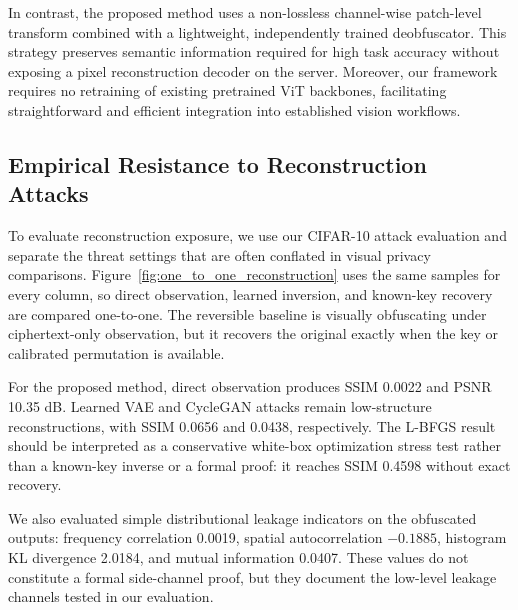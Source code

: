 \documentclass{ieeeaccess}
\newcommand{\rev}[1]{{\color{green}#1}}
\begin{document}
\rev{In contrast, the proposed method uses a non-lossless channel-wise patch-level transform combined with a lightweight, independently trained deobfuscator. This strategy preserves semantic information required for high task accuracy without exposing a pixel reconstruction decoder on the server. Moreover, our framework requires no retraining of existing pretrained ViT backbones, facilitating straightforward and efficient integration into established vision workflows.}

\subsection{\rev{Empirical Resistance to Reconstruction Attacks}}



\rev{To evaluate reconstruction exposure, we use our CIFAR-10 attack evaluation and separate the threat settings that are often conflated in visual privacy comparisons. Figure~\ref{fig:one_to_one_reconstruction} uses the same samples for every column, so direct observation, learned inversion, and known-key recovery are compared one-to-one. The reversible baseline is visually obfuscating under ciphertext-only observation, but it recovers the original exactly when the key or calibrated permutation is available.}

\rev{For the proposed method, direct observation produces SSIM 0.0022 and PSNR 10.35 dB. Learned VAE and CycleGAN attacks remain low-structure reconstructions, with SSIM 0.0656 and 0.0438, respectively. The L-BFGS result should be interpreted as a conservative white-box optimization stress test rather than a known-key inverse or a formal proof: it reaches SSIM 0.4598 without exact recovery.}

\rev{We also evaluated simple distributional leakage indicators on the obfuscated outputs: frequency correlation 0.0019, spatial autocorrelation $-0.1885$, histogram KL divergence 2.0184, and mutual information 0.0407. These values do not constitute a formal side-channel proof, but they document the low-level leakage channels tested in our evaluation.}
\end{document}
